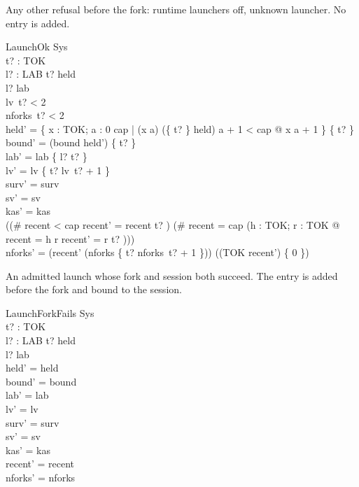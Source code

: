 \documentclass[a4paper,10pt,fleqn]{article}
\begin{document}
Any other refusal before the fork: runtime launchers off, unknown launcher. No entry is added.

\begin{schema}{LaunchOk}
  \Delta Sys \\
  t? : TOK \\ l? : LAB
\where
  t? \notin \dom held \\
  l? \notin \dom lab \\
  lv~t? < 2 \\
  nforks~t? < 2 \\
  held' = \{ x : TOK; a : 0 \upto cap | (x \mapsto a) \in (\{ t? \} \ndres held) \land a + 1 < cap @ x \mapsto a + 1 \} \cup \{ t?  \} \\
  bound' = (bound \cap \dom held') \cup \{ t? \} \\
  lab' = lab \cup \{ l? \mapsto t? \} \\
  lv' = lv \oplus \{ t? \mapsto lv~t? + 1 \} \\
  surv' = surv \\
  sv' = sv \\
  kas' = kas \\
  ((\# recent < cap \land recent' = recent \cat \langle t? \rangle) \lor (\# recent = cap \land (\exists h : TOK; r : \seq TOK @ recent = \langle h \rangle \cat r \land recent' = r \cat \langle t? \rangle))) \\
  nforks' = (\ran recent' \dres (nforks \oplus \{ t? \mapsto nforks~t? + 1 \})) \cup ((TOK \setminus \ran recent') \cross \{ 0 \})
\end{schema}

An admitted launch whose fork and session both succeed. The entry is added before the fork and bound to the session.

\begin{schema}{LaunchForkFails}
  \Delta Sys \\
  t? : TOK \\ l? : LAB
\where
  t? \notin \dom held \\
  l? \notin \dom lab \\
  held' = held \\
  bound' = bound \\
  lab' = lab \\
  lv' = lv \\
  surv' = surv \\
  sv' = sv \\
  kas' = kas \\
  recent' = recent \\
  nforks' = nforks
\end{schema}
\end{document}
